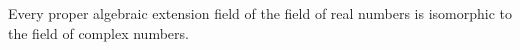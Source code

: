 Every proper algebraic extension field of the field of real numbers is isomorphic to the field of complex numbers.
